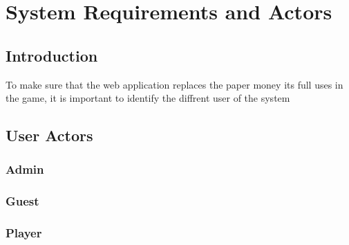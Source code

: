 \documentclass{article}
\begin{document}
\section {System Requirements and Actors}
\subsection {Introduction}
To make sure that the web application replaces the paper money its full uses in the game, it is important to identify the diffrent user of the system

\subsection {User Actors}
\subsubsection {Admin}
\subsubsection {Guest}
\subsubsection {Player}
\end{document}
